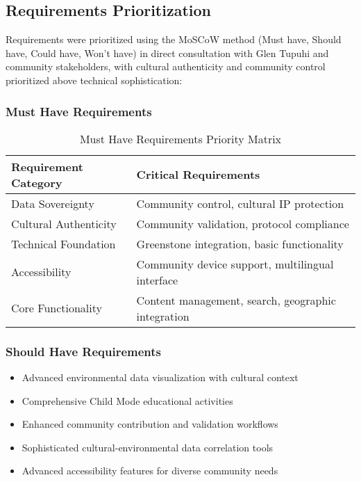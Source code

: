 \subsection{Requirements Prioritization}
\label{subsec:requirements_prioritization}

Requirements were prioritized using the MoSCoW method (Must have, Should have, Could have, Won't have) in direct consultation with Glen Tupuhi and community stakeholders, with cultural authenticity and community control prioritized above technical sophistication:

\subsubsection{Must Have Requirements}
\label{subsubsec:must_have}

\begin{table}[H]
\centering
\caption{Must Have Requirements Priority Matrix}
\label{tab:must_have_requirements}
\begin{tabular}{@{}ll@{}}
\toprule
\textbf{Requirement Category} & \textbf{Critical Requirements} \\
\midrule
Data Sovereignty & Community control, cultural IP protection \\
Cultural Authenticity & Community validation, protocol compliance \\
Technical Foundation & Greenstone integration, basic functionality \\
Accessibility & Community device support, multilingual interface \\
Core Functionality & Content management, search, geographic integration \\
\bottomrule
\end{tabular}
\end{table}

\subsubsection{Should Have Requirements}
\label{subsubsec:should_have}

\begin{itemize}
    \item Advanced environmental data visualization with cultural context
    \item Comprehensive Child Mode educational activities
    \item Enhanced community contribution and validation workflows
    \item Sophisticated cultural-environmental data correlation tools
    \item Advanced accessibility features for diverse community needs
\end{itemize}

